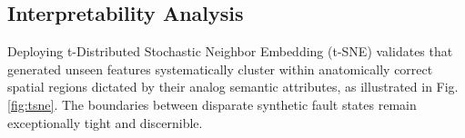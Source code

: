 \subsection{Interpretability Analysis}
Deploying t-Distributed Stochastic Neighbor Embedding (t-SNE) \cite{vandermaaten2008tsne} validates that generated unseen features systematically cluster within anatomically correct spatial regions dictated by their analog semantic attributes, as illustrated in Fig. \ref{fig:tsne}. The boundaries between disparate synthetic fault states remain exceptionally tight and discernible.